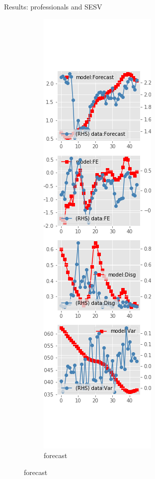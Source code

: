 \documentclass{beamer}
\begin{document}
\begin{frame}{Results: professionals and SESV}
	\begin{figure}[ht]
		\label{SESV_diag_SPF}
		\begin{subfigure}[b]{0.19\textwidth}
			\centering
			\caption{forecast}
			\includegraphics[width=\textwidth, height = 0.8\textheight]{figuresDraft/spf_se_est_sv_diag0.png}

\end{subfigure}
\end{figure}
\end{frame}
\end{document}
